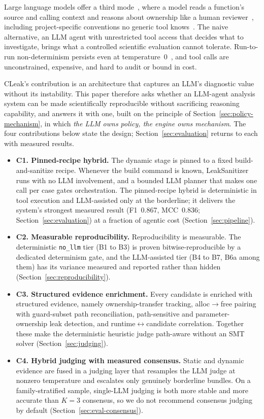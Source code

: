 \documentclass[a4paper]{llncs}
\begin{document}
Large language models offer a third mode~\cite{iris}, where a model reads a
function's source and calling context and reasons about ownership like
a human reviewer~\cite{llm-vuln-eval}, including project-specific
conventions no generic tool knows~\cite{llm-proxy-static}. The naive
alternative, an LLM agent with unrestricted tool access that decides
what to investigate, brings what a controlled scientific evaluation
cannot tolerate. Run-to-run non-determinism persists even at
temperature~0~\cite{nondeterminism}, and tool
calls are unconstrained, expensive, and hard to audit or bound in cost.

CLeak's contribution is an architecture that captures an LLM's
diagnostic value without its instability. This paper therefore asks
whether an LLM-agent analysis system can be made scientifically
reproducible without sacrificing reasoning capability, and answers it
with one, built on the principle of
Section~\ref{sec:policy-mechanism}, in which \emph{the LLM owns
policy, the engine owns mechanism}. The four contributions below
state the design; Section~\ref{sec:evaluation} returns to each with
measured results.

\label{sec:contributions}
\begin{itemize}
\item \textbf{C1. Pinned-recipe hybrid.} The dynamic stage is pinned
to a fixed build-and-sanitize recipe. Whenever the build command is
known, LeakSanitizer runs with no LLM involvement, and a bounded LLM
planner that makes one call per case gates orchestration. The
pinned-recipe hybrid is deterministic in tool execution and
LLM-assisted only at the borderline; it delivers the system's
strongest measured result (F1~0.867, MCC~0.836;
Section~\ref{sec:evaluation}) at a fraction of agentic cost
(Section~\ref{sec:pipeline}).
\item \textbf{C2. Measurable reproducibility.} Reproducibility is
measurable. The deterministic \texttt{no\_llm} tier (B1 to B3) is
proven bitwise-reproducible by a dedicated determinism gate, and the
LLM-assisted tier (B4 to B7, B6a among them) has its variance measured
and reported rather than hidden (Section~\ref{sec:reproducibility}).
\item \textbf{C3. Structured evidence enrichment.} Every candidate
is enriched with structured evidence, namely ownership-transfer tracking,
alloc$\to$free pairing with guard-subset path reconciliation,
path-sensitive and parameter-ownership leak detection, and
runtime$\leftrightarrow$candidate correlation. Together these make
the deterministic heuristic judge path-aware without an SMT solver
(Section~\ref{sec:judging}).
\item \textbf{C4. Hybrid judging with measured consensus.} Static
and dynamic evidence are fused in a judging layer that resamples the
LLM judge at nonzero temperature and escalates only genuinely
borderline bundles. On a family-stratified sample, single-LLM judging
is both more stable and more accurate than $K{=}3$ consensus, so we do
not recommend consensus judging by default
(Section~\ref{sec:eval-consensus}).
\end{itemize}
\end{document}
